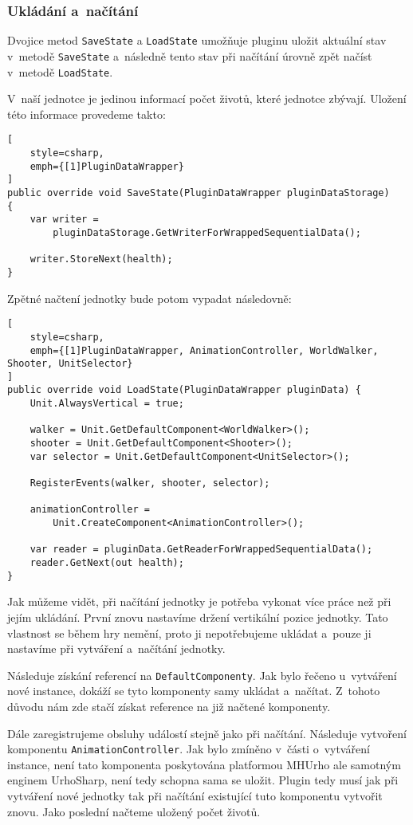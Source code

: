 \subsubsection{Ukládání a~načítání}

Dvojice metod \texttt{SaveState} a \texttt{LoadState} umožňuje pluginu uložit aktuální stav v~metodě \texttt{SaveState} a~následně tento stav při načítání úrovně zpět načíst v~metodě \texttt{LoadState}.

V~naší jednotce je jedinou informací počet životů, které jednotce zbývají. Uložení této informace provedeme takto:
\begin{lstlisting}[
	style=csharp,
	emph={[1]PluginDataWrapper}
]
public override void SaveState(PluginDataWrapper pluginDataStorage)
{
	var writer = 
		pluginDataStorage.GetWriterForWrappedSequentialData();

	writer.StoreNext(health);
}
\end{lstlisting}

\newpage
Zpětné načtení jednotky bude potom vypadat následovně:
\begin{lstlisting}[
	style=csharp,
	emph={[1]PluginDataWrapper, AnimationController, WorldWalker, Shooter, UnitSelector}
]
public override void LoadState(PluginDataWrapper pluginData) {
	Unit.AlwaysVertical = true;

	walker = Unit.GetDefaultComponent<WorldWalker>();
	shooter = Unit.GetDefaultComponent<Shooter>();
	var selector = Unit.GetDefaultComponent<UnitSelector>();

	RegisterEvents(walker, shooter, selector);

	animationController =
		Unit.CreateComponent<AnimationController>();

	var reader = pluginData.GetReaderForWrappedSequentialData();
	reader.GetNext(out health);
}
\end{lstlisting}

Jak můžeme vidět, při načítání jednotky je potřeba vykonat více práce než při jejím ukládání. První znovu nastavíme držení vertikální pozice jednotky. Tato vlastnost se během hry nemění, proto ji nepotřebujeme ukládat a~pouze ji nastavíme při vytváření a~načítání jednotky. 

Následuje získání referencí na \texttt{DefaultComponenty}. Jak bylo řečeno u~vytváření nové instance, dokáží se tyto komponenty samy ukládat a~načítat. Z~tohoto důvodu nám zde stačí získat reference na již načtené komponenty. 

Dále zaregistrujeme obsluhy událostí stejně jako při načítání. Následuje vytvoření komponentu \texttt{AnimationController}. Jak bylo zmíněno v~části o~vytváření instance, není tato komponenta poskytována platformou MHUrho ale samotným enginem UrhoSharp, není tedy schopna sama se uložit. Plugin tedy musí jak při vytváření nové jednotky tak při načítání existující tuto komponentu vytvořit znovu. Jako poslední načteme uložený počet životů.

